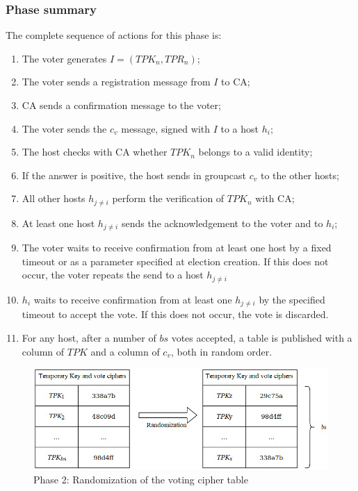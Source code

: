 \documentclass[english]{textolivre}
\begin{document}
\subsubsection{Phase summary}

The complete sequence of actions for this phase is:

\begin{enumerate}
    \item  The voter generates $I = (TPK_{n}, TPR_{n})$;
\item The voter sends a registration message from $I$ to CA;
\item CA sends a confirmation message to the voter;
\item The voter sends the $c_{v}$ message, signed with $I$ to a host $h_{i}$;
\item The host checks with CA whether $TPK_{n}$ belongs to a valid identity;
\item If the answer is positive, the host sends in groupcast $c_{v}$ to the other hosts;

\item All other hosts $h_{j \neq i}$ perform the verification of $TPK_{n}$ with CA;

\item At least one host $h_{j \neq i}$ sends the acknowledgement to the voter and to $h_{i}$;

\item The voter waits to receive confirmation from at least one host by a fixed timeout or as a parameter specified at election creation. If this does not occur, the voter repeats the send to a host $h_{j \neq i}$

\item $h_{i}$ waits to receive confirmation from at least one $h_{j \neq i}$ by the specified timeout to accept the vote. If this does not occur, the vote is discarded.

\item For any host, after a number of $bs$ votes accepted, a table is published with a column of $TPK$ and a column of $c_{v}$, both in random order.

\end{enumerate}

\begin{figure}[htb]
\centering
\begin{minipage}{.8\textwidth}
\includegraphics[width=\textwidth]{imagens/fig-004.png}
\caption{Phase 2:  Randomization of the voting cipher table}\label{randomizacao}
\end{minipage}
\end{figure}
\end{document}

